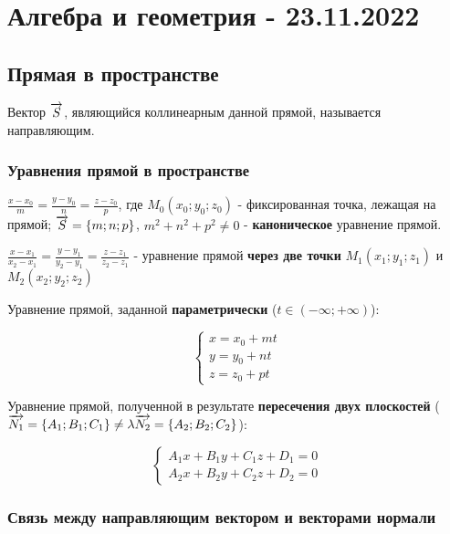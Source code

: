 \documentclass{article}
\def\vec{\ensuremath\overrightarrow}
\begin{document}
\pagebreak
\section{Алгебра и геометрия - 23.11.2022}

\subsection{Прямая в пространстве}

\begin{flushleft}

Вектор $\vec{S}$, являющийся коллинеарным данной прямой, называется направляющим.

\subsubsection{Уравнения прямой в пространстве}

$\frac{x - x_0}{m} = \frac{y - y_0}{n} = \frac{z - z_0}{p}$, где $M_0(x_0; y_0; z_0)$ - фиксированная точка, лежащая на прямой; $\vec{S} = \{ m; n; p \}$, $m^2 + n^2 + p^2 \ne 0$ - \textbf{каноническое} уравнение прямой.

$\frac{x - x_1}{x_2 - x_1} = \frac{y - y_1}{y_2 - y_1} = \frac{z - z_1}{z_2 - z_1}$ - уравнение прямой \textbf{через две точки} $M_1(x_1; y_1; z_1)$ и $M_2(x_2; y_2; z_2)$

Уравнение прямой, заданной \textbf{параметрически} ($t \in (- \infty; +\infty) $):

\begin{equation}
    \begin{cases}
        x = x_0 + mt \\
        y = y_0 + n t \\
        z = z_0 + pt
    \end{cases}
\end{equation}

Уравнение прямой, полученной в результате \textbf{пересечения двух плоскостей} ($\vec{N_1} = \{ A_1; B_1; C_1 \} \ne \lambda \vec{N_2} = \{ A_2; B_2; C_2 \}$):

\begin{equation}
    \begin{cases}
        A_1 x + B_1 y + C_1 z + D_1 = 0 \\
        A_2 x + B_2 y + C_2 z + D_2 = 0
    \end{cases}
\end{equation}

\subsubsection{Связь между направляющим вектором и векторами нормали}


\end{flushleft}
\end{document}
